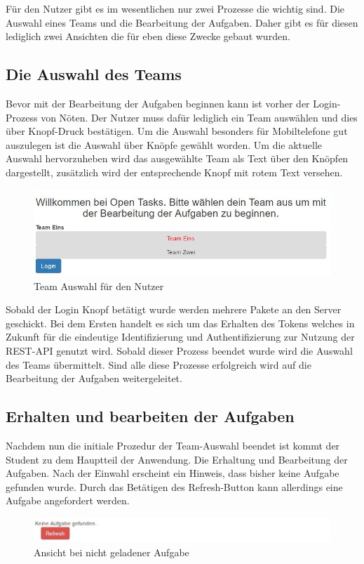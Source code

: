 Für den Nutzer gibt es im wesentlichen nur zwei Prozesse die wichtig sind. Die Auswahl eines Teams und die Bearbeitung der Aufgaben. Daher gibt es für diesen lediglich zwei Ansichten die für eben diese Zwecke gebaut wurden.

\subsection{Die Auswahl des Teams}

Bevor mit der Bearbeitung der Aufgaben beginnen kann ist vorher der Login-Prozess von Nöten. Der Nutzer muss dafür lediglich ein Team auswählen und dies über Knopf-Druck bestätigen. Um die Auswahl besonders für Mobiltelefone gut auszulegen ist die Auswahl über Knöpfe gewählt worden. Um die aktuelle Auswahl hervorzuheben wird das ausgewählte Team als Text über den Knöpfen dargestellt, zusätzlich wird der entsprechende Knopf mit rotem Text versehen.

\begin{figure}[htp]     %
\centering
\includegraphics[width=1\textwidth]{bilder/UserLogin} 
\caption[Login für den Nutzer / Teamauswahl]{Team Auswahl für den Nutzer}
\end{figure} 

Sobald der Login Knopf betätigt wurde werden mehrere Pakete an den Server geschickt. Bei dem Ersten handelt es sich um das Erhalten des Tokens welches in Zukunft für die eindeutige Identifizierung und Authentifizierung zur Nutzung der REST-API genutzt wird. Sobald dieser Prozess beendet wurde wird die Auswahl des Teams übermittelt. Sind alle diese Prozesse erfolgreich wird auf die Bearbeitung der Aufgaben weitergeleitet. 

\subsection{Erhalten und bearbeiten der Aufgaben}

Nachdem nun die initiale Prozedur der Team-Auswahl beendet ist kommt der Student zu dem Hauptteil der Anwendung. Die Erhaltung und Bearbeitung der Aufgaben. Nach der Einwahl erscheint ein Hinweis, dass bisher keine Aufgabe gefunden wurde. Durch das Betätigen des Refresh-Button kann allerdings eine Aufgabe angefordert werden. \\
\begin{figure}[htp]     %
\centering
\includegraphics[width=1\textwidth]{bilder/NoTask} 
\caption[Ansicht bei nicht geladener Aufgabe]{Ansicht bei nicht geladener Aufgabe}
\end{figure} 

